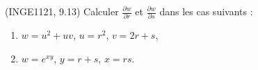 

\begin{exercice}\label{exoFoncDeuxVar0017}

	(INGE1121, 9.13) Calculer $\frac{ \partial w }{ \partial r }$ et $\frac{ \partial w }{ \partial s }$ dans les cas suivants :
	\begin{enumerate}

		\item
			$w=u^2+uv$, $u=r^2$, $v=2r+s$,
		\item
			$w= e^{xy}$, $y=r+s$, $x=rs$.

	\end{enumerate}
	

\end{exercice}
